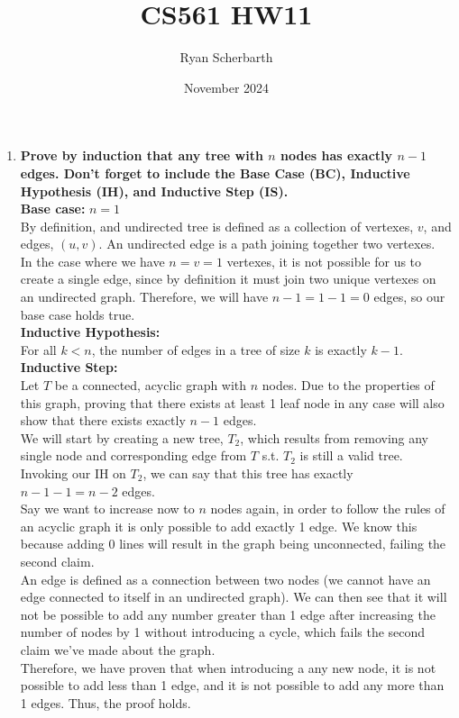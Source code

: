 \documentclass{article}
\title{CS561 HW11}
\author{Ryan Scherbarth}
\date{November 2024}
\begin{document}
\maketitle

\begin{enumerate}

\item \textbf{ Prove by induction that any tree with $n$ nodes has exactly $n-1$ edges. Don't forget to include the Base Case (BC), Inductive Hypothesis (IH), and Inductive Step (IS). } \\

\textbf{Base case: } $n=1$ \\
By definition, and undirected tree is defined as a collection of vertexes, $v$, and edges, $(u,v)$. An undirected edge is a path joining together two vertexes. \\
\newline 
In the case where we have $n = v = 1$ vertexes, it is not possible for us to create a single edge, since by definition it must join two unique vertexes on an undirected graph. Therefore, we will have $n-1 = 1 - 1 = 0$ edges, so our base case holds true. \\

\textbf{ Inductive Hypothesis: } \\
For all $k < n$, the number of edges in a tree of size $k$ is exactly $k-1$. \\

\textbf{ Inductive Step: } \\
Let $T$ be a connected, acyclic graph with $n$ nodes. Due to the properties of this graph, proving that there exists at least 1 leaf node in any case will also show that there exists exactly $n-1$ edges. \\
\newline 
We will start by creating a new tree, $T_2$, which results from removing any single node and corresponding edge from $T$ s.t. $T_2$ is still a valid tree. Invoking our IH on $T_2$, we can say that this tree has exactly $n-1-1 = n-2$ edges. \\
\newline 
Say we want to increase now to $n$ nodes again, in order to follow the rules of an acyclic graph it is only possible to add exactly 1 edge. We know this because adding 0 lines will result in the graph being unconnected, failing the second claim. \\ 
\newline 
An edge is defined as a connection between two nodes (we cannot have an edge connected to itself in an undirected graph). We can then see that it will not be possible to add any number greater than 1 edge after increasing the number of nodes by 1 without introducing a cycle, which fails the second claim we've made about the graph. \\
\newline 
Therefore, we have proven that when introducing a any new node, it is not possible to add less than 1 edge, and it is not possible to add any more than 1 edges. Thus, the proof holds. 







\end{enumerate}
\end{document}
